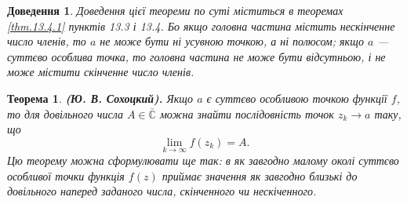 \documentclass[fontsize=14pt]{scrartcl}
\theoremstyle{theorem}
\newtheorem{thm}{Теорема}[section]
\theoremstyle{proof}
\newtheorem*{dov}{Доведення}
\begin{document}
\begin{dov}
Доведення цієї теореми по суті міститься в теоремах \ref{thm.13.4.1} пунктів 13.3 і 13.4. Бо якщо головна частина містить нескінченне число членів, то $a$ не може бути ні усувною точкою, а ні полюсом; якщо $a$ --- суттєво особлива точка, то головна частина не може бути відсутньою, і не може містити скінченне число членів.
\end{dov}

\begin{thm}\label{thm.13.5.2}
  \textbf{(Ю. В. Сохоцкий).} Якщо $a$ є суттєво особливою точкою функції $f$, то для довільного числа $A\in \bar{\mathbb{C}}$ можна знайти послідовність точок $z_k \to a$ таку, що
  $$\lim_{k\to\infty}f(z_k)=A.$$
  Цю теорему можна сформулювати ще так: в як завгодно малому околі суттєво особливої точки функція $f(z)$ приймає значення як завгодно близькі до довільного наперед заданого числа, скінченного чи нескіченного.
\end{thm}
\end{document}
